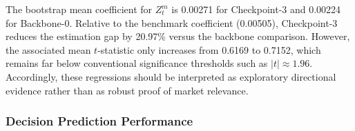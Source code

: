 % 
%
The bootstrap mean coefficient for $Z_t^m$ is 0.00271 for Checkpoint-3 and 0.00224 for Backbone-0. Relative to the benchmark coefficient (0.00505), Checkpoint-3 reduces the estimation gap by 20.97\% versus the backbone comparison. However, the associated mean $t$-statistic only increases from 0.6169 to 0.7152, which remains far below conventional significance thresholds such as $|t|\approx1.96$. Accordingly, these regressions should be interpreted as exploratory directional evidence rather than as robust proof of market relevance.








\subsubsection*{Decision Prediction Performance}

